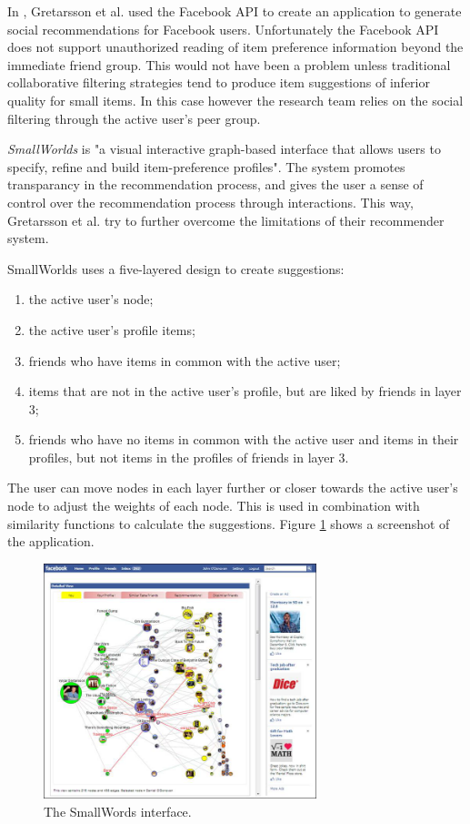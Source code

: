 In \cite{gretarsson:2010}, Gretarsson et al. used the Facebook API to create an application to generate social recommendations for Facebook users. Unfortunately the Facebook API does not support unauthorized reading of item preference information beyond the immediate friend group. This would not have been a problem unless traditional collaborative filtering strategies tend to produce item suggestions of inferior quality for small items. In this case however the research team relies on the social filtering through the active user's peer group\cite{gretarsson:2010}.

\emph{SmallWorlds} is "a visual interactive graph-based interface that allows users to specify, refine and build item-preference profiles"\cite{gretarsson:2010}. The system promotes transparancy in the recommendation process, and gives the user a sense of control over the recommendation process through interactions. This way, Gretarsson et al. try to further overcome the limitations of their recommender system\cite{gretarsson:2010}.

SmallWorlds uses a five-layered design to create suggestions:

\begin{enumerate}
	\item the active user's node;
	\item the active user's profile items;
	\item friends who have items in common with the active user;
	\item items that are not in the active user’s profile, but are liked by friends in layer $3$;
	\item friends who have no items in common with the active user and items in their profiles, but not items in the profiles of friends in layer $3$.
\end{enumerate}

The user can move nodes in each layer further or closer towards the active user's node to adjust the weights of each node. This is used in combination with similarity functions to calculate the suggestions. Figure \ref{figure:smallworlds} shows a screenshot of the application.

\begin{figure}%
	\begin{center}
		\includegraphics[width=300px]{img/smallworlds}%
	\end{center}
	\caption{The SmallWords interface.}%
	\label{figure:smallworlds}%
\end{figure}


